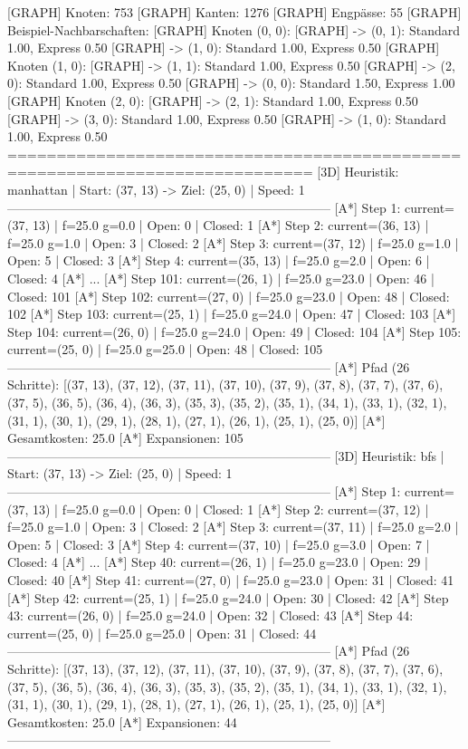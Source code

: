 [GRAPH]    Knoten:              753
[GRAPH]    Kanten:              1276
[GRAPH]    Engpässe:            55
[GRAPH]    Beispiel-Nachbarschaften:
[GRAPH]      Knoten (0, 0):
[GRAPH]        -> (0, 1): Standard 1.00, Express 0.50
[GRAPH]        -> (1, 0): Standard 1.00, Express 0.50
[GRAPH]      Knoten (1, 0):
[GRAPH]        -> (1, 1): Standard 1.00, Express 0.50
[GRAPH]        -> (2, 0): Standard 1.00, Express 0.50
[GRAPH]        -> (0, 0): Standard 1.50, Express 1.00
[GRAPH]      Knoten (2, 0):
[GRAPH]        -> (2, 1): Standard 1.00, Express 0.50
[GRAPH]        -> (3, 0): Standard 1.00, Express 0.50
[GRAPH]        -> (1, 0): Standard 1.00, Express 0.50
=============================================================================
[3D] Heuristik: manhattan | Start: (37, 13) -> Ziel: (25, 0) | Speed: 1
-----------------------------------------------------------------------------
[A*] Step   1: current=(37, 13) | f=25.0 g=0.0 | Open: 0 | Closed: 1
[A*] Step   2: current=(36, 13) | f=25.0 g=1.0 | Open: 3 | Closed: 2
[A*] Step   3: current=(37, 12) | f=25.0 g=1.0 | Open: 5 | Closed: 3
[A*] Step   4: current=(35, 13) | f=25.0 g=2.0 | Open: 6 | Closed: 4
[A*]   ...
[A*] Step 101: current=(26, 1) | f=25.0 g=23.0 | Open: 46 | Closed: 101
[A*] Step 102: current=(27, 0) | f=25.0 g=23.0 | Open: 48 | Closed: 102
[A*] Step 103: current=(25, 1) | f=25.0 g=24.0 | Open: 47 | Closed: 103
[A*] Step 104: current=(26, 0) | f=25.0 g=24.0 | Open: 49 | Closed: 104
[A*] Step 105: current=(25, 0) | f=25.0 g=25.0 | Open: 48 | Closed: 105
-----------------------------------------------------------------------------
[A*] Pfad (26 Schritte): [(37, 13), (37, 12), (37, 11), (37, 10), (37, 9), 
(37, 8), (37, 7), (37, 6), (37, 5), (36, 5), (36, 4), (36, 3), (35, 3), 
(35, 2), (35, 1), (34, 1), (33, 1), (32, 1), (31, 1), (30, 1), (29, 1), 
(28, 1), (27, 1), (26, 1), (25, 1), (25, 0)]
[A*] Gesamtkosten: 25.0
[A*] Expansionen: 105
-----------------------------------------------------------------------------
[3D] Heuristik: bfs       | Start: (37, 13) -> Ziel: (25, 0) | Speed: 1
-----------------------------------------------------------------------------
[A*] Step   1: current=(37, 13) | f=25.0 g=0.0 | Open: 0 | Closed: 1
[A*] Step   2: current=(37, 12) | f=25.0 g=1.0 | Open: 3 | Closed: 2
[A*] Step   3: current=(37, 11) | f=25.0 g=2.0 | Open: 5 | Closed: 3
[A*] Step   4: current=(37, 10) | f=25.0 g=3.0 | Open: 7 | Closed: 4
[A*]   ...
[A*] Step  40: current=(26, 1) | f=25.0 g=23.0 | Open: 29 | Closed: 40
[A*] Step  41: current=(27, 0) | f=25.0 g=23.0 | Open: 31 | Closed: 41
[A*] Step  42: current=(25, 1) | f=25.0 g=24.0 | Open: 30 | Closed: 42
[A*] Step  43: current=(26, 0) | f=25.0 g=24.0 | Open: 32 | Closed: 43
[A*] Step  44: current=(25, 0) | f=25.0 g=25.0 | Open: 31 | Closed: 44
-----------------------------------------------------------------------------
[A*] Pfad (26 Schritte): [(37, 13), (37, 12), (37, 11), (37, 10), (37, 9), 
(37, 8), (37, 7), (37, 6), (37, 5), (36, 5), (36, 4), (36, 3), (35, 3), 
(35, 2), (35, 1), (34, 1), (33, 1), (32, 1), (31, 1), (30, 1), (29, 1), 
(28, 1), (27, 1), (26, 1), (25, 1), (25, 0)]
[A*] Gesamtkosten: 25.0
[A*] Expansionen: 44
-----------------------------------------------------------------------------